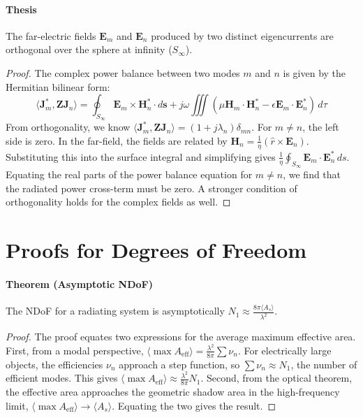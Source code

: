 \documentclass[11pt, a4paper]{report}
\begin{document}
\paragraph{Thesis} The far-electric fields $\mathbf{E}_m$ and $\mathbf{E}_n$ produced by two distinct eigencurrents are orthogonal over the sphere at infinity ($S_\infty$).
\begin{proof}
The complex power balance between two modes $m$ and $n$ is given by the Hermitian bilinear form:
\begin{equation}
\langle \mathbf{J}_m^*, \mathbf{Z}\mathbf{J}_n \rangle = \oint_{S_\infty} \mathbf{E}_m \times \mathbf{H}_n^* \cdot d\mathbf{s} + j\omega \iiint (\mu \mathbf{H}_m\cdot\mathbf{H}_n^* - \epsilon \mathbf{E}_m\cdot\mathbf{E}_n^*) \,d\tau
\end{equation}
From orthogonality, we know $\langle \mathbf{J}_m^*, \mathbf{Z}\mathbf{J}_n \rangle = (1+j\lambda_n)\delta_{mn}$. For $m \neq n$, the left side is zero. In the far-field, the fields are related by $\mathbf{H}_n = \frac{1}{\eta}(\hat{r} \times \mathbf{E}_n)$. Substituting this into the surface integral and simplifying gives $\frac{1}{\eta} \oint_{S_\infty} \mathbf{E}_m \cdot \mathbf{E}_n^* \,ds$. Equating the real parts of the power balance equation for $m \neq n$, we find that the radiated power cross-term must be zero. A stronger condition of orthogonality holds for the complex fields as well.
\end{proof}

\section{Proofs for Degrees of Freedom}
\paragraph{Theorem (Asymptotic NDoF)} The NDoF for a radiating system is asymptotically $N_1 \approx \frac{8\pi \langle A_s \rangle}{\lambda^2}$.
\begin{proof}
The proof equates two expressions for the average maximum effective area. First, from a modal perspective, $\langle \max A_{\text{eff}} \rangle = \frac{\lambda^2}{8\pi} \sum \nu_n$. For electrically large objects, the efficiencies $\nu_n$ approach a step function, so $\sum \nu_n \approx N_1$, the number of efficient modes. This gives $\langle \max A_{\text{eff}} \rangle \approx \frac{\lambda^2}{8\pi} N_1$. Second, from the optical theorem, the effective area approaches the geometric shadow area in the high-frequency limit, $\langle \max A_{\text{eff}} \rangle \to \langle A_s \rangle$. Equating the two gives the result.
\end{proof}
\end{document}
